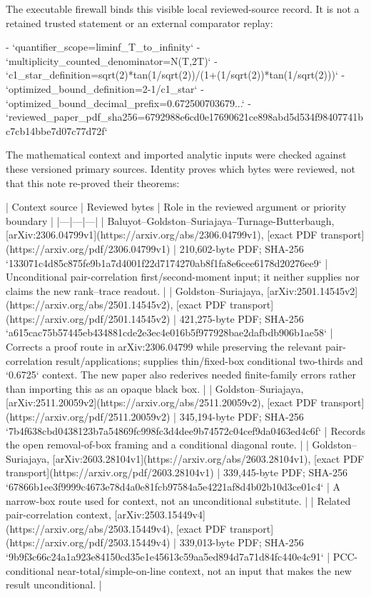 \documentclass[11pt]{article}
\begin{document}
\begin{markdown}
The executable firewall binds this visible local reviewed-source record. It is not a retained
trusted statement or an external comparator replay:

- `quantifier_scope=liminf_T_to_infinity`
- `multiplicity_counted_denominator=N(T,2T)`
- `c1_star_definition=sqrt(2)*tan(1/sqrt(2))/(1+(1/sqrt(2))*tan(1/sqrt(2)))`
- `optimized_bound_definition=2-1/c1_star`
- `optimized_bound_decimal_prefix=0.672500703679...`
- `reviewed_paper_pdf_sha256=6792988e6cd0e17690621ce898abd5d534f98407741bc7cb14bbe7d07c77d72f`

The mathematical context and imported analytic inputs were checked against these versioned primary
sources. Identity proves which bytes were reviewed, not that this note re-proved their theorems:

| Context source | Reviewed bytes | Role in the reviewed argument or priority boundary |
|---|---|---|
| Baluyot--Goldston--Suriajaya--Turnage-Butterbaugh, [arXiv:2306.04799v1](https://arxiv.org/abs/2306.04799v1), [exact PDF transport](https://arxiv.org/pdf/2306.04799v1) | 210,602-byte PDF; SHA-256 `133071c4d85c875fe9b1a7d4001f22d7174270ab8f1fa8e6cee6178d20276ee9` | Unconditional pair-correlation first/second-moment input; it neither supplies nor claims the new rank--trace readout. |
| Goldston--Suriajaya, [arXiv:2501.14545v2](https://arxiv.org/abs/2501.14545v2), [exact PDF transport](https://arxiv.org/pdf/2501.14545v2) | 421,275-byte PDF; SHA-256 `a615cac75b57445eb434881cde2e3ec4e016b5f977928bae2dafbdb906b1ae58` | Corrects a proof route in arXiv:2306.04799 while preserving the relevant pair-correlation result/applications; supplies thin/fixed-box conditional two-thirds and `0.6725` context. The new paper also rederives needed finite-family errors rather than importing this as an opaque black box. |
| Goldston--Suriajaya, [arXiv:2511.20059v2](https://arxiv.org/abs/2511.20059v2), [exact PDF transport](https://arxiv.org/pdf/2511.20059v2) | 345,194-byte PDF; SHA-256 `7b4f638cbd0438123b7a54869fc998fc3d4dee9b74572c04cef9da0463ed4c6f` | Records the open removal-of-box framing and a conditional diagonal route. |
| Goldston--Suriajaya, [arXiv:2603.28104v1](https://arxiv.org/abs/2603.28104v1), [exact PDF transport](https://arxiv.org/pdf/2603.28104v1) | 339,445-byte PDF; SHA-256 `67866b1ee3f9999c4673e78d4a0e81fcb97584a5e4221af8d4b02b10d3ce01c4` | A narrow-box route used for context, not an unconditional substitute. |
| Related pair-correlation context, [arXiv:2503.15449v4](https://arxiv.org/abs/2503.15449v4), [exact PDF transport](https://arxiv.org/pdf/2503.15449v4) | 339,013-byte PDF; SHA-256 `9b9f3c66c24a1a923e84150cd35e1e45613c59aa5ed894d7a71d84fc440e4c91` | PCC-conditional near-total/simple-on-line context, not an input that makes the new result unconditional. |

\end{markdown}
\end{document}
